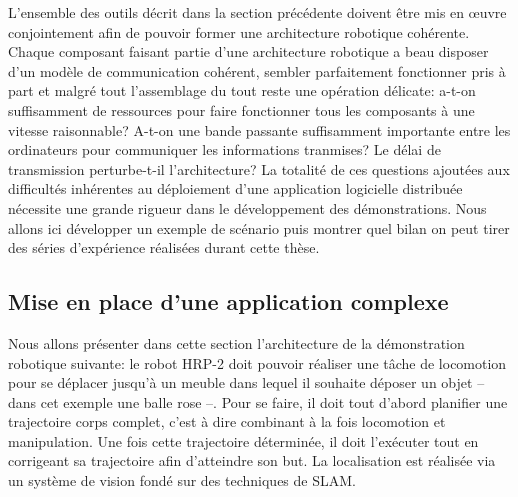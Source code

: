 L'ensemble des outils décrit dans la section précédente doivent être
mis en \oe uvre conjointement afin de pouvoir former une architecture
robotique cohérente. Chaque composant faisant partie d'une
architecture robotique a beau disposer d'un modèle de communication
cohérent, sembler parfaitement fonctionner pris à part et malgré tout
l'assemblage du tout reste une opération délicate: a-t-on suffisamment
de ressources pour faire fonctionner tous les composants à une vitesse
raisonnable? A-t-on une bande passante suffisamment importante entre
les ordinateurs pour communiquer les informations tranmises? Le délai
de transmission perturbe-t-il l'architecture? La totalité de ces
questions ajoutées aux difficultés inhérentes au déploiement d'une
application logicielle distribuée nécessite une grande rigueur dans le
développement des démonstrations. Nous allons ici développer un
exemple de scénario puis montrer quel bilan on peut tirer des séries
d'expérience réalisées durant cette thèse.


\subsection{Mise en place d'une application complexe}


Nous allons présenter dans cette section l'architecture de la
démonstration robotique suivante: le robot HRP-2 doit pouvoir réaliser
une tâche de locomotion pour se déplacer jusqu'à un meuble dans lequel
il souhaite déposer un objet -- dans cet exemple une balle rose
--. Pour se faire, il doit tout d'abord planifier une trajectoire
corps complet, c'est à dire combinant à la fois locomotion et
manipulation. Une fois cette trajectoire déterminée, il doit
l'exécuter tout en corrigeant sa trajectoire afin d'atteindre son
but. La localisation est réalisée via un système de vision fondé sur
des techniques de SLAM.


